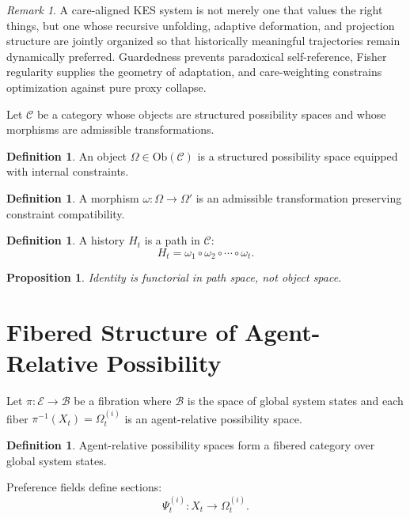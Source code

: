\documentclass[11pt,a4paper]{article}
\newtheorem{proposition}[theorem]{Proposition}
\theoremstyle{definition}
\newtheorem{definition}[theorem]{Definition}
\theoremstyle{remark}
\newtheorem{remark}[theorem]{Remark}
\begin{document}
\begin{remark}
A care-aligned KES system is not merely one that values the right things, but one whose recursive unfolding, adaptive deformation, and projection structure are jointly organized so that historically meaningful trajectories remain dynamically preferred. Guardedness prevents paradoxical self-reference, Fisher regularity supplies the geometry of adaptation, and care-weighting constrains optimization against pure proxy collapse.
\end{remark}



Let $\mathcal{C}$ be a category whose objects are structured possibility spaces and whose morphisms are admissible transformations.

\begin{definition}
An object $\Omega \in \mathrm{Ob}(\mathcal{C})$ is a structured possibility space equipped with internal constraints.
\end{definition}

\begin{definition}
A morphism $\omega : \Omega \to \Omega'$ is an admissible transformation preserving constraint compatibility.
\end{definition}

\begin{definition}
A history $H_t$ is a path in $\mathcal{C}$:
\[
H_t = \omega_1 \circ \omega_2 \circ \cdots \circ \omega_t.
\]
\end{definition}

\begin{proposition}
Identity is functorial in path space, not object space.
\end{proposition}

\section{Fibered Structure of Agent-Relative Possibility}

Let $\pi : \mathcal{E} \to \mathcal{B}$ be a fibration where $\mathcal{B}$ is the space of global system states and each fiber $\pi^{-1}(X_t) = \Omega_t^{(i)}$ is an agent-relative possibility space.

\begin{definition}
Agent-relative possibility spaces form a fibered category over global system states.
\end{definition}

Preference fields define sections:
\[
\Psi_t^{(i)} : X_t \to \Omega_t^{(i)}.
\]
\end{document}
